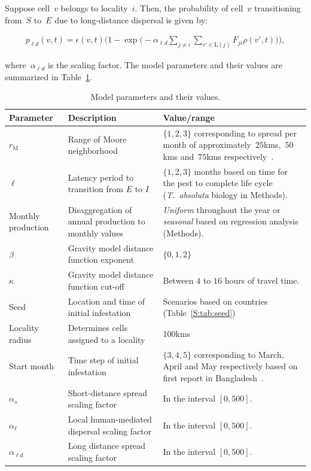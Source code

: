 \documentclass[11pt]{article}
\newcommand{\tuta}{\emph{T.~absoluta}}
\newcommand{\infest}{\rho}
\newcommand{\suitable}{\epsilon}
\newcommand{\pld}{p_{\ell d}}
\newcommand{\asd}{\alpha_s}
\newcommand{\afm}{\alpha_{\ell}}
\newcommand{\ald}{\alpha_{\ell d}}
\newcommand{\locality}{\mathrm{L}}
\newcommand{\mooreRange}{r_\mathrm{M}}
\theoremstyle{definition}
\begin{document}
Suppose cell~$v$ belongs to locality~$i$. Then, the probability of cell~$v$
transitioning from~$S$ to~$E$ due to long-distance dispersal is given by:
\begin{linenomath}
\begin{align}\label{eqn:plocal}
    \pld(v,t)=\suitable(v,t)\bigg(1-
    \exp\Big(-\ald\sum_{j\ne i}\sum_{v'\in\locality(j)}F_{ji}\infest(v',t)\Big)\bigg),
\end{align}
\end{linenomath}
where~$\ald$ is the scaling factor.
The model parameters and their values are summarized in
Table~\ref{tab:param}. 
\begin{table}[t]
\caption{Model parameters and their values.\label{tab:param}}
    \centering
	\small
{} %
    \begin{tabular}{p{}p{}p{}}
		\hline		
		Parameter & Description & Value/range \\
\hline		
\hline
$\mooreRange$ & Range of Moore neighborhood & $\{1,2,3\}$ corresponding to
spread per month of 
approximately~$25$kms,~$50$kms and~$75$kms
respectively~\cite{guimapi2016modeling,martins2018assessing}. \\
$\ell$ & Latency period to transition from $E$ to $I$ & $\{1,2,3\}$ months
based on time for the pest to complete life cycle (\tuta{} biology in
Methods). \\
Monthly production & Disaggregation of annual production to monthly values
& \emph{Uniform} throughout the year or \emph{seasonal} based on regression
analysis (Methods). \\
$\beta$ & Gravity model distance function exponent & $\{0,1,2\}$ \\
$\kappa$ & Gravity model distance function cut-off & Between $4$ to $16$ hours
of travel time. \\
Seed & Location and time of initial infestation & Scenarios based on
countries (Table~\ref{S:tab:seed})\\
Locality radius & Determines cells assigned to a locality & 100kms \\\hline
Start month & Time step of initial infestation & $\{3,4,5\}$ corresponding
to March, April and May respectively based on first report in
Bangladesh~\cite{hossain2016first}. \\
$\asd$ & Short-distance spread scaling factor & In the interval $[0,500]$.\\
$\afm$ & Local human-mediated dispersal scaling factor & In the interval $[0,500]$.\\
$\ald$ & Long distance spread scaling factor & In the interval $[0,500]$.\\
\hline
\end{tabular}
\end{table}
\end{document}
